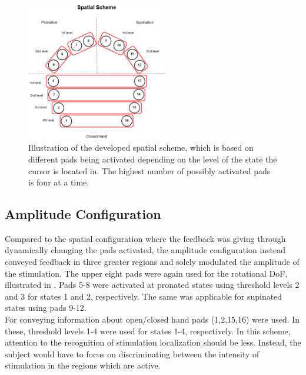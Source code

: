 \begin{figure}[H]                 
	\includegraphics[width=0.55\textwidth]{figures/El_array_spatial}  
	\caption{Illustration of the developed spatial scheme, which is based on different pads being activated depending on the level of the state the cursor is located in. The highest number of possibly activated pads is four at a time.}
	\label{fig:spatial} 
\end{figure}


\subsection{Amplitude Configuration}

Compared to the spatial configuration where the feedback was giving through dynamically changing the pads activated, the amplitude configuration instead conveyed feedback in three greater regions and solely modulated the amplitude of the stimulation. The upper eight pads were again used for the rotational DoF, illustrated in . Pads 5-8 were activated at pronated states using threshold levels 2 and 3 for states 1 and 2, respectively. The same was applicable for supinated states using pads 9-12. \\
For conveying information about open/closed hand pads (1,2,15,16) were used. In these, threshold levels 1-4 were used for states 1-4, respectively. In this scheme, attention to the recognition of stimulation localization should be less. Instead, the subject would have to focus on discriminating between the intensity of stimulation in the regions which are active.          

